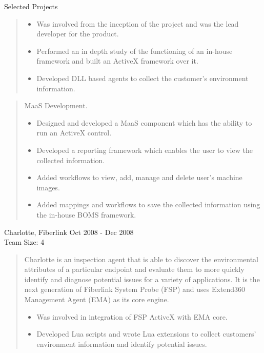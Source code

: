 \documentclass{resume}
\newcommand{\teamsize}{\\\sc\footnotesize Team Size: }
\begin{document}
\begin{category}{Selected Projects}{}
\begin{quote}
            \begin{itemize}
                \item Was involved from the inception of the project and was the
                    lead developer for the product.
                \item Performed an in depth study of the functioning of an
                    in-house framework and built an ActiveX framework over it.
                \item Developed DLL based agents to collect the customer's
                    environment information.
            \end{itemize}
        \end{quote}
        \begin{quote}
            MaaS Development.
            \begin{itemize}
                \item Designed and developed a MaaS component which has the
                    ability to run an ActiveX control.
                \item Developed a reporting framework which enables the user to
                    view the collected information.
                \item Added workflows to view, add, manage and delete user's
                    machine images.
                \item Added mappings and workflows to save the collected
                    information using the in-house BOMS framework.
            \end{itemize}
        \end{quote}

    \pagebreak

    \item {\topic Charlotte,} Fiberlink
        {\period Oct 2008 - Dec 2008}
        {\teamsize 4}
        \begin{quote}
            Charlotte is an inspection agent that is able to discover the
            environmental attributes of a particular endpoint and evaluate them
            to more quickly identify and diagnose potential issues for a
            variety of applications. It is the next generation of Fiberlink
            System Probe (FSP) and uses Extend360 Management Agent (EMA) as its
            core engine.
            \begin{itemize}
                \item Was involved in integration of FSP ActiveX with EMA core.
                \item Developed Lua scripts and wrote Lua extensions to collect
                    customers' environment information and identify potential
                    issues.
            \end{itemize}
        \end{quote}


\end{category}
\end{document}
